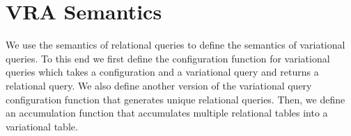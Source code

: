 \section{VRA Semantics }
\label{sec:vrasem}


We use the semantics of relational queries to define the semantics of 
variational queries. To this end we first define the configuration function
for variational queries which takes a configuration and a variational query
and returns a relational query. We also define another version of the
variational query configuration function that generates unique relational
queries. Then, we define an accumulation function that accumulates
multiple relational tables into a variational table. 
%



